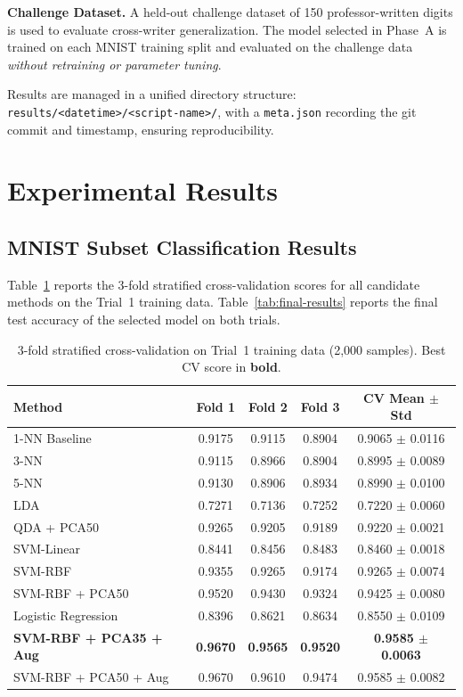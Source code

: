 \documentclass[11pt,a4paper,twocolumn]{article}
\begin{document}
\textbf{Challenge Dataset.} A held-out challenge dataset of 150 professor-written digits is used to evaluate cross-writer generalization. The model selected in Phase~A is trained on each MNIST training split and evaluated on the challenge data \emph{without retraining or parameter tuning}.

Results are managed in a unified directory structure: \texttt{results/<datetime>/<script-name>/}, with a \texttt{meta.json} recording the git commit and timestamp, ensuring reproducibility.

\section{Experimental Results}

\subsection{MNIST Subset Classification Results}

Table~\ref{tab:cv-results} reports the 3-fold stratified cross-validation scores for all candidate methods on the Trial~1 training data. Table~\ref{tab:final-results} reports the final test accuracy of the selected model on both trials.

\begin{table}[t]
\centering
\caption{3-fold stratified cross-validation on Trial~1 training data (2,000 samples). Best CV score in \textbf{bold}.}
\label{tab:cv-results}
\small
\begin{tabular}{@{}lcccc@{}}
\toprule
\textbf{Method} & \textbf{Fold 1} & \textbf{Fold 2} & \textbf{Fold 3} & \textbf{CV Mean $\pm$ Std} \\
\midrule
1-NN Baseline & 0.9175 & 0.9115 & 0.8904 & 0.9065 $\pm$ 0.0116 \\
3-NN & 0.9115 & 0.8966 & 0.8904 & 0.8995 $\pm$ 0.0089 \\
5-NN & 0.9130 & 0.8906 & 0.8934 & 0.8990 $\pm$ 0.0100 \\
LDA & 0.7271 & 0.7136 & 0.7252 & 0.7220 $\pm$ 0.0060 \\
QDA + PCA50 & 0.9265 & 0.9205 & 0.9189 & 0.9220 $\pm$ 0.0021 \\
SVM-Linear & 0.8441 & 0.8456 & 0.8483 & 0.8460 $\pm$ 0.0018 \\
SVM-RBF & 0.9355 & 0.9265 & 0.9174 & 0.9265 $\pm$ 0.0074 \\
SVM-RBF + PCA50 & 0.9520 & 0.9430 & 0.9324 & 0.9425 $\pm$ 0.0080 \\
Logistic Regression & 0.8396 & 0.8621 & 0.8634 & 0.8550 $\pm$ 0.0109 \\
\textbf{SVM-RBF + PCA35 + Aug} & \textbf{0.9670} & \textbf{0.9565} & \textbf{0.9520} & \textbf{0.9585 $\pm$ 0.0063} \\
SVM-RBF + PCA50 + Aug & 0.9670 & 0.9610 & 0.9474 & 0.9585 $\pm$ 0.0082 \\
\bottomrule
\end{tabular}
\end{table}
\end{document}
